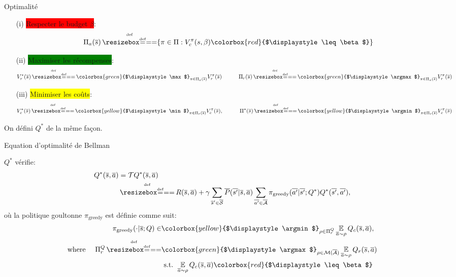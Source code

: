 \documentclass[french,handout]{beamer}
\newcommand{\mathcolorbox}[2]{\colorbox{#1}{$\displaystyle #2$}}
\begin{document}
    \begin{frame}{Optimalité}
        \begin{definition}
            \begin{enumerate}
                \item[(i)] \pause\colorbox{red}{Respecter le budget $\beta$}:
                \begin{equation*}
                    \Pi_a(\os) \eqdef \{\pi\in\Pi: V_c^\pi(s, \beta) \mathcolorbox{red}{\leq \beta}\}
                \end{equation*}
                \item[(ii)] \pause\colorbox{green}{Maximiser les récompenses}:
                \begin{equation*}
                    V_r^*(\os) \eqdef \mathcolorbox{green}{\max}_{\pi\in\Pi_a(\os)}  V_r^\pi(\os) \qquad\quad \Pi_r(\os) \eqdef \mathcolorbox{green}{\argmax}_{\pi\in\Pi_a(\os)}  V_r^\pi(\os)
                \end{equation*}
                \item[(iii)] \pause\colorbox{yellow}{Minimiser les coûts}:
                \begin{equation*}
                    V_c^*(\os) \eqdef \mathcolorbox{yellow}{\min}_{\pi\in\Pi_r(\os)}  V_c^\pi(\os), \qquad\quad \Pi^*(\os) \eqdef \mathcolorbox{yellow}{\argmin}_{\pi\in\Pi_r(\os)}  V_c^\pi(\os)
                \end{equation*}
            \end{enumerate}

            \pause On défini $Q^*$ de la même façon.
        \end{definition}
    \end{frame}

    \begin{frame}{Equation d'optimalité de Bellman}
        \begin{theorem}
            $Q^*$ vérifie:
            \begin{align*}
                Q^{*}(\os, \oa) &= \cT Q^{*}(\os, \oa)\\
                &\eqdef R(\os, \oa) + \gamma \sum_{\os'\in\ocS} \ov{P}(\ov{s'} | \os, \oa)\sum_{\ov{a'}\in \ocA} \pi_\text{greedy}(\ov{a'}|\ov{s'}; Q^*) Q^{*}(\ov{s'}, \ov{a'}),
            \end{align*}
           où la politique goultonne $\pi_\text{greedy}$ est définie comme suit:
            \begin{align*}
                \pi_\text{greedy}(\cdot|\os; Q) \in &\mathcolorbox{yellow}{\argmin}_{\rho\in\Pi_r^Q} \expectedvalueover{\oa\sim\rho}Q_c(\os, \oa), \\
                \text{where }\quad \Pi_r^Q \eqdef &\mathcolorbox{green}{\argmax}_{\rho\in\cM(\ocA)} \expectedvalueover{\oa\sim\rho} Q_r(\os, \oa) \\
                & \text{ s.t. }  \expectedvalueover{\oa\sim\rho} Q_c(\os, \oa) \mathcolorbox{red}{\leq \beta}
            \end{align*}
        \end{theorem}
    \end{frame}
\end{document}

